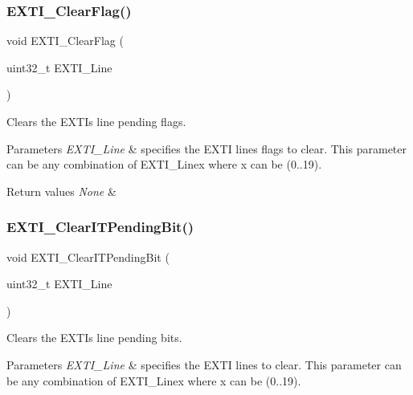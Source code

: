 \subsubsection{\texorpdfstring{EXTI\_ClearFlag()}{EXTI\_ClearFlag()}}
{\footnotesize\ttfamily void E\+X\+T\+I\+\_\+\+Clear\+Flag (\begin{DoxyParamCaption}\item[{uint32\+\_\+t}]{E\+X\+T\+I\+\_\+\+Line }\end{DoxyParamCaption})}



Clears the E\+X\+TI\textquotesingle{}s line pending flags. 


\begin{DoxyParams}{Parameters}
{\em E\+X\+T\+I\+\_\+\+Line} & specifies the E\+X\+TI lines flags to clear. This parameter can be any combination of E\+X\+T\+I\+\_\+\+Linex where x can be (0..19). \\
\hline
\end{DoxyParams}

\begin{DoxyRetVals}{Return values}
{\em None} & \\
\hline
\end{DoxyRetVals}
\mbox{\label{group___e_x_t_i___private___functions_ga3652a7e682728b310c124e7e974d1468}} 
\subsubsection{\texorpdfstring{EXTI\_ClearITPendingBit()}{EXTI\_ClearITPendingBit()}}
{\footnotesize\ttfamily void E\+X\+T\+I\+\_\+\+Clear\+I\+T\+Pending\+Bit (\begin{DoxyParamCaption}\item[{uint32\+\_\+t}]{E\+X\+T\+I\+\_\+\+Line }\end{DoxyParamCaption})}



Clears the E\+X\+TI\textquotesingle{}s line pending bits. 


\begin{DoxyParams}{Parameters}
{\em E\+X\+T\+I\+\_\+\+Line} & specifies the E\+X\+TI lines to clear. This parameter can be any combination of E\+X\+T\+I\+\_\+\+Linex where x can be (0..19). \\
\hline
\end{DoxyParams}

